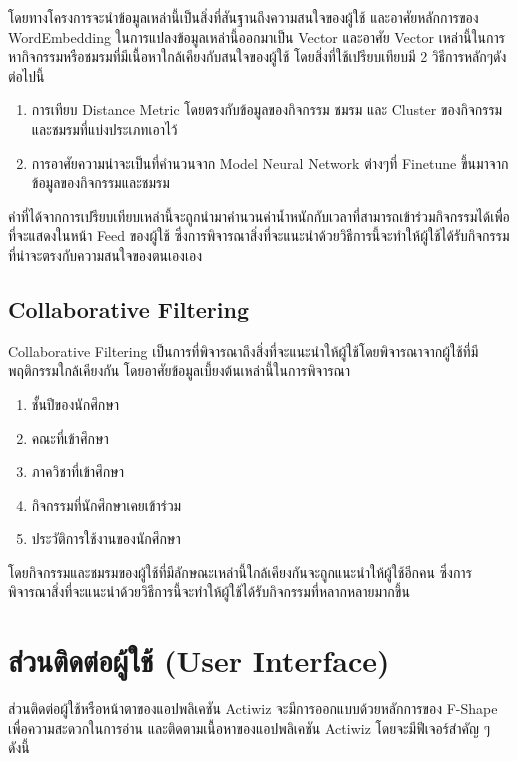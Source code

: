 \documentclass[14pt,oneside,openright,a4paper]{cpe-thai-project}
\begin{document}
โดยทางโครงการจะนำข้อมูลเหล่านี้เป็นสิ่งที่สันฐานถึงความสนใจของผู้ใช้ และอาศัยหลักการของ WordEmbedding ในการแปลงข้อมูลเหล่านี้ออกมาเป็น Vector และอาศัย Vector เหล่านี้ในการหากิจกรรมหรือชมรมที่มีเนื้อหาใกล้เคียงกับสนใจของผู้ใช้ โดยสิ่งที่ใช้เปรียบเทียบมี 2 วิธีการหลักๆดังต่อไปนี้

\begin{enumerate}
  \item การเทียบ Distance Metric โดยตรงกับข้อมูลของกิจกรรม ชมรม และ Cluster ของกิจกรรมและชมรมที่แบ่งประเภทเอาไว้
  \item การอาศัยความน่าจะเป็นที่คำนวนจาก Model Neural Network ต่างๆที่ Finetune ขึ้นมาจากข้อมูลของกิจกรรมและชมรม
\end{enumerate}
ค่าที่ได้จากการเปรียบเทียบเหล่านี้จะถูกนำมาคำนวนค่าน้ำหนักกับเวลาที่สามารถเข้าร่วมกิจกรรมได้เพื่อที่จะแสดงในหน้า Feed ของผู้ใช้ ซึ่งการพิจารณาสิ่งที่จะแนะนำด้วยวิธีการนี้จะทำให้ผู้ใช้ได้รับกิจกรรมที่น่าจะตรงกับความสนใจของตนเองเอง

\subsection{Collaborative Filtering}
Collaborative Filtering เป็นการที่พิจารณาถึงสิ่งที่จะแนะนำให้ผู้ใช้โดยพิจารณาจากผู้ใช้ที่มีพฤติกรรมใกล้เคียงกัน โดยอาศัยข้อมูลเบี้ยงต้นเหล่านี้ในการพิจารณา

\begin{enumerate}
  \item ชั้นปีของนักศึกษา
  \item คณะที่เข้าศึกษา
  \item ภาควิชาที่เข้าศึกษา
  \item กิจกรรมที่นักศึกษาเคยเข้าร่วม
  \item ประวัติการใช้งานของนักศึกษา
\end{enumerate}

โดยกิจกรรมและชมรมของผู้ใช้ที่มีลักษณะเหล่านี้ใกล้เคียงกันจะถูกแนะนำให้ผู้ใช้อีกคน ซึ่งการพิจารณาสิ่งที่จะแนะนำด้วยวิธีการนี้จะทำให้ผู้ใช้ได้รับกิจกรรมที่หลากหลายมากขึ้น

\newpage

\section{ส่วนติดต่อผู้ใช้ (User Interface)}
ส่วนติดต่อผู้ใช้หรือหน้าตาของแอปพลิเคชัน Actiwiz จะมีการออกแบบด้วยหลักการของ F-Shape เพื่อความสะดวกในการอ่าน และติดตามเนื้อหาของแอปพลิเคชัน Actiwiz
โดยจะมีฟีเจอร์สำคัญ ๆ ดังนี้ \\
\end{document}
